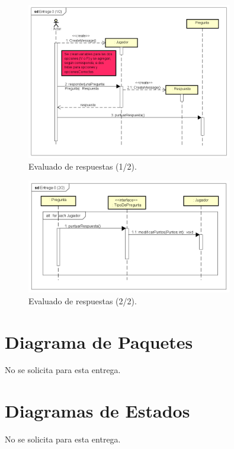 \documentclass[titlepage,a4paper]{article}
\begin{document}
\begin{figure}[H]
\centering
\includegraphics[width=0.8\textwidth]{img/UMLSeq3.png}
\caption{\label{fig:class01}Evaluado de respuestas (1/2).}
\end{figure}

\begin{figure}[H]
\centering
\includegraphics[width=0.8\textwidth]{img/UMLSeq4.png}
\caption{\label{fig:class01}Evaluado de respuestas (2/2).}
\end{figure}

\section{Diagrama de Paquetes}

No se solicita para esta entrega.

\section{Diagramas de Estados}

No se solicita para esta entrega.
\end{document}
